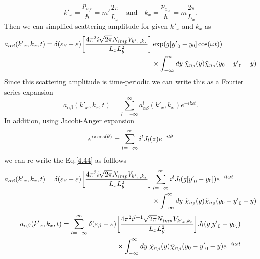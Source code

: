 \begin{equation} \label{4.43}
    {k'}_x = \frac{p_{x_{\beta}}}{\hbar} = m' \frac{2\pi}{L_x}
    \quad \text{and} \quad
    k_x = \frac{p_{x_{\alpha}}}{\hbar} = m \frac{2\pi}{L_x}.
\end{equation}
Then we can simplfied scattering amplitude for given ${k'}_x$ and $k_x$ as
\begin{equation} \label{4.44}
  \begin{aligned}
    a_{\alpha\beta}({k'}_x,k_x,t)  =
    \delta(\varepsilon_{\beta} - \varepsilon)
    \qty[\frac { 4\pi^2 i \sqrt{2\pi} N_{imp} V_{{k'}_x,k_x}}{L_x L_y^2}]&
    \exp(g[{y'}_0 - y_0]\cos(\omega t)) \\
    & \times
    \int_{-\infty}^{\infty} dy \;
    \tilde{\chi}_{n_{\beta}}\qty(y)
    \tilde{\chi}_{n_{\beta}}\qty(y_0 - {y'}_0 - y)
  \end{aligned}
\end{equation}
Since this scattering amplitude is time-periodic we can write this as a Fourier series expansion
\begin{equation} \label{4.45}
    a_{\alpha\beta}({k'}_x,k_x,t) =
    \sum_{l=-\infty}^{\infty} a^l_{\alpha\beta}({k'}_x,k_x) e^{-il\omega t}.
\end{equation}
In addition, using Jacobi-Anger expansion
\begin{equation} \label{4.46}
    e^{iz\cos(\theta)} = \sum_{l=-\infty}^{\infty} i^l J_l\qty(z) e^{-il\theta}
\end{equation}
we can re-write the Eq.\eqref{4.44} as folllows
\begin{equation} \label{4.47}
  \begin{aligned}
    a_{\alpha\beta}({k'}_x,k_x,t)  =
    \delta(\varepsilon_{\beta} - \varepsilon)
    \qty[\frac { 4\pi^2 i \sqrt{2\pi} N_{imp} V_{{k'}_x,k_x}}{L_x L_y^2}]&
    \sum_{l=-\infty}^{\infty} i^l J_l\qty(g[{y'}_0 - y_0]) e^{-il\omega t}\\
    & \times
    \int_{-\infty}^{\infty} dy \;
    \tilde{\chi}_{n_{\beta}}\qty(y)
    \tilde{\chi}_{n_{\beta}}\qty(y_0 - {y'}_0 - y)
  \end{aligned}
\end{equation}
\begin{equation} \label{4.48}
  \begin{aligned}
    a_{\alpha\beta}({k'}_x,k_x,t)  =
    \sum_{l=-\infty}^{\infty}
    \delta(\varepsilon_{\beta} - \varepsilon) &
    \qty[\frac { 4\pi^2 i^{l+1} \sqrt{2\pi} N_{imp} V_{{k'}_x,k_x}}{L_x L_y^2}]
    J_l\qty(g[{y'}_0 - y_0]) \\
    & \times
    \int_{-\infty}^{\infty} dy \;
    \tilde{\chi}_{n_{\beta}}\qty(y)
    \tilde{\chi}_{n_{\beta}}\qty(y_0 - {y'}_0 - y) e^{-il\omega t}
  \end{aligned}
\end{equation}
